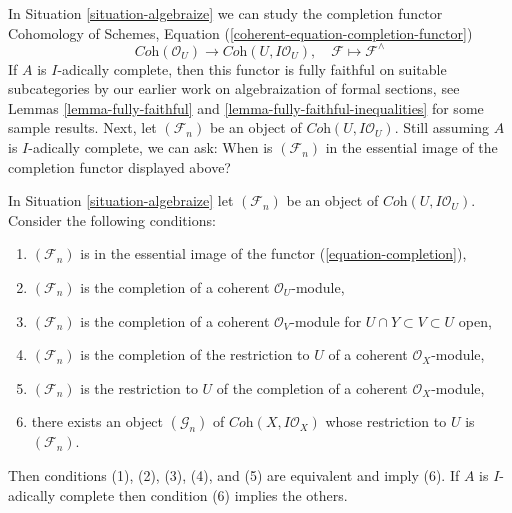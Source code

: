\noindent
In Situation \ref{situation-algebraize} we can study the completion functor
Cohomology of Schemes, Equation (\ref{coherent-equation-completion-functor})
\begin{equation}
\label{equation-completion}
\textit{Coh}(\mathcal{O}_U)
\longrightarrow
\textit{Coh}(U, I\mathcal{O}_U),\quad
\mathcal{F} \longmapsto \mathcal{F}^\wedge
\end{equation}
If $A$ is $I$-adically complete, then this functor is fully faithful
on suitable subcategories by our earlier work on algebraization of
formal sections, see Lemmas \ref{lemma-fully-faithful}
and \ref{lemma-fully-faithful-inequalities} for some sample results.
Next, let $(\mathcal{F}_n)$ be an object of $\textit{Coh}(U, I\mathcal{O}_U)$.
Still assuming $A$ is $I$-adically complete, we can ask:
When is $(\mathcal{F}_n)$ in the essential image of the completion
functor displayed above?

\begin{lemma}
\label{lemma-essential-image-completion}
In Situation \ref{situation-algebraize} let $(\mathcal{F}_n)$
be an object of $\textit{Coh}(U, I\mathcal{O}_U)$. Consider the
following conditions:
\begin{enumerate}
\item $(\mathcal{F}_n)$ is in the essential image
of the functor (\ref{equation-completion}),
\item $(\mathcal{F}_n)$ is the completion of a
coherent $\mathcal{O}_U$-module,
\item $(\mathcal{F}_n)$ is the completion of a coherent
$\mathcal{O}_V$-module for $U \cap Y \subset V \subset U$ open,
\item $(\mathcal{F}_n)$ is the completion of
the restriction to $U$ of a coherent $\mathcal{O}_X$-module,
\item $(\mathcal{F}_n)$ is the restriction to $U$ of
the completion of a coherent $\mathcal{O}_X$-module,
\item there exists an object $(\mathcal{G}_n)$ of
$\textit{Coh}(X, I\mathcal{O}_X)$ whose restriction
to $U$ is $(\mathcal{F}_n)$.
\end{enumerate}
Then conditions (1), (2), (3), (4), and (5) are equivalent and imply (6).
If $A$ is $I$-adically complete then condition (6) implies the others.
\end{lemma}

